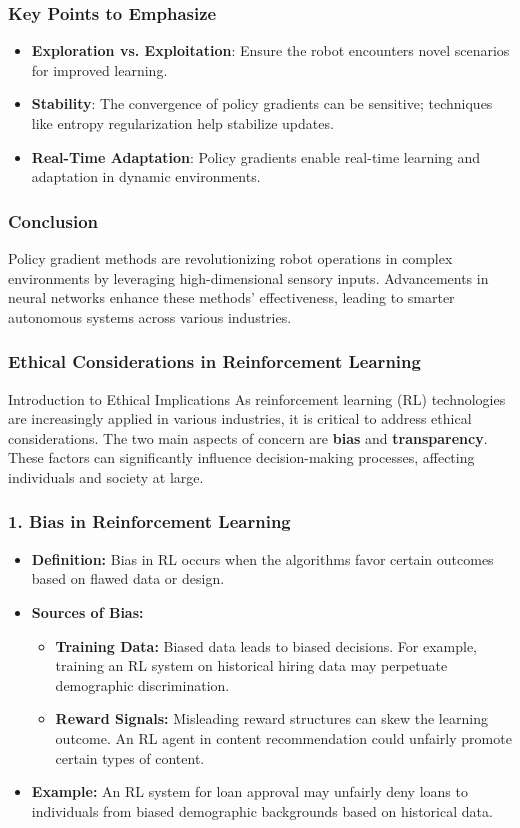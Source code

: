 \documentclass[aspectratio=169]{beamer}
\begin{document}
\begin{frame}[fragile]
    \frametitle{Key Points to Emphasize}
    \begin{itemize}
        \item \textbf{Exploration vs. Exploitation}: Ensure the robot encounters novel scenarios for improved learning.
        \item \textbf{Stability}: The convergence of policy gradients can be sensitive; techniques like entropy regularization help stabilize updates.
        \item \textbf{Real-Time Adaptation}: Policy gradients enable real-time learning and adaptation in dynamic environments.
    \end{itemize}
\end{frame}

\begin{frame}[fragile]
    \frametitle{Conclusion}
    Policy gradient methods are revolutionizing robot operations in complex environments by leveraging high-dimensional sensory inputs. Advancements in neural networks enhance these methods' effectiveness, leading to smarter autonomous systems across various industries.
\end{frame}

\begin{frame}[fragile]
    \frametitle{Ethical Considerations in Reinforcement Learning}
    \begin{block}{Introduction to Ethical Implications}
        As reinforcement learning (RL) technologies are increasingly applied in various industries, it is critical to address ethical considerations. The two main aspects of concern are \textbf{bias} and \textbf{transparency}. These factors can significantly influence decision-making processes, affecting individuals and society at large.
    \end{block}
\end{frame}

\begin{frame}[fragile]
    \frametitle{1. Bias in Reinforcement Learning}
    \begin{itemize}
        \item \textbf{Definition:} Bias in RL occurs when the algorithms favor certain outcomes based on flawed data or design.
        \item \textbf{Sources of Bias:}
        \begin{itemize}
            \item \textbf{Training Data:} Biased data leads to biased decisions. For example, training an RL system on historical hiring data may perpetuate demographic discrimination.
            \item \textbf{Reward Signals:} Misleading reward structures can skew the learning outcome. An RL agent in content recommendation could unfairly promote certain types of content.
        \end{itemize}
        \item \textbf{Example:} An RL system for loan approval may unfairly deny loans to individuals from biased demographic backgrounds based on historical data.
    \end{itemize}
\end{frame}
\end{document}
